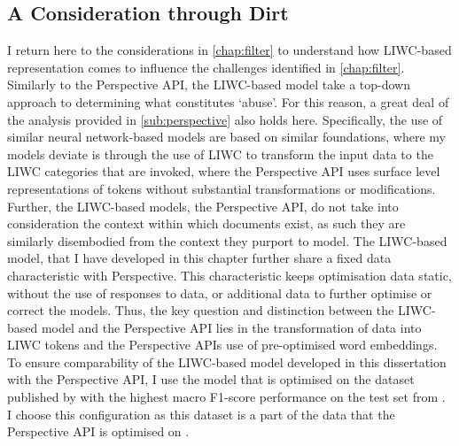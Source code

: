 
\subsection{A Consideration through Dirt}\label{sub:LIWC_model}
I return here to the considerations in \cref{chap:filter} to understand how LIWC-based representation comes to influence the challenges identified in \cref{chap:filter}.
Similarly to the Perspective API, the LIWC-based model take a top-down approach to determining what constitutes `abuse'. For this reason, a great deal of the analysis provided in \cref{sub:perspective} also holds here.
Specifically, the use of similar neural network-based models are based on similar foundations, where my models deviate is through the use of LIWC \cite{Pennebaker:2001} to transform the input data to the LIWC categories that are invoked, where the Perspective API uses surface level representations of tokens without substantial transformations or modifications.
Further, the LIWC-based models,  the Perspective API, do not take into consideration the context within which documents exist, as such they are similarly disembodied from the context they purport to model.
The LIWC-based model, that I have developed in this chapter further share a fixed data characteristic with Perspective.
This characteristic keeps optimisation data static, without the use of responses to data, or additional data to further optimise or correct the models.
Thus, the key question and distinction between the LIWC-based model and the Perspective API lies in the transformation of data into LIWC tokens and the Perspective APIs use of pre-optimised word embeddings.
To ensure comparability of the LIWC-based model developed in this dissertation with the Perspective API, I use the model that is optimised on the dataset published by \citet{Wulczyn:2017} with the highest macro F1-score performance on the test set from \citet{Wulczyn:2017}.
I choose this configuration as this dataset is a part of the data that the Perspective API is optimised on \citep{Perspective:Github}.

